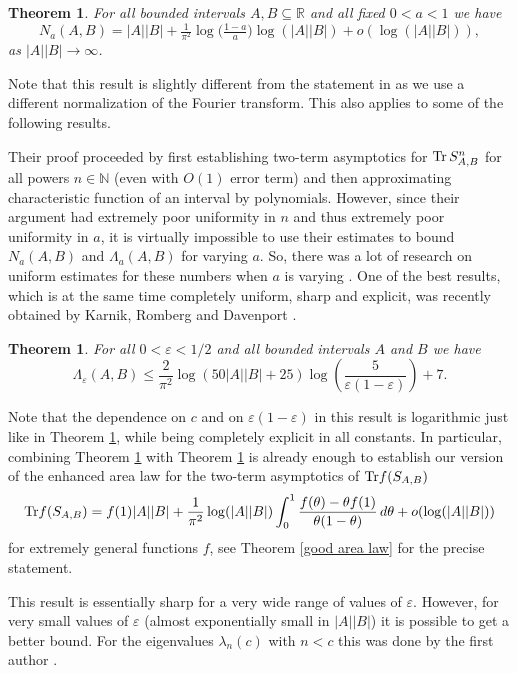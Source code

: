 \documentclass[12pt]{amsart}
\numberwithin{equation}{section}
\newcommand{\N}{\mathbb{N}}
\newcommand{\R}{\mathbb{R}}
\newcommand{\eps}{\varepsilon}
\newtheorem{theorem}[Thm]{Theorem}
\begin{document}
\begin{theorem}\label{Slepian}
For all bounded intervals $A, B \subseteq \R$ and all fixed $0<a<1$ we have
\[
N_a(A,B) = |A||B| + \tfrac{1}{\pi^2}\log\big(\tfrac{1-a}{a}\big)\log(|A||B|) + o(\log (|A||B|)),
\]
as $|A||B| \to \infty$.
\end{theorem}
Note that this result is slightly different from the statement in \cite{widom_landau} as we use a different normalization of the Fourier transform. This also applies to some of the following results.

Their proof proceeded by first establishing two-term asymptotics for ${\rm Tr}\, S^n_{A,B}$ for all powers $n\in\N$ (even with $O(1)$ error term) and then approximating characteristic function of an interval by polynomials. However, since their argument had extremely poor uniformity in $n$ and thus extremely poor uniformity in $a$, it is virtually impossible to use their estimates to bound $N_a(A,B)$ and $\Lambda_a(A,B)$ for varying $a$. So, there was a lot of research on uniform estimates for these numbers when $a$ is varying \cite{Israel2015,Bonami_Karoui_17,Kulikov_24}. One of the best results, which is at the same time completely uniform, sharp and explicit, was recently obtained by Karnik, Romberg and Davenport \cite{Karnik_Romberg_Davenport}.

\begin{theorem}\label{Karnik}
For all $0<\eps<1/2$ and all bounded intervals $A$ and $B$ we have
\[
\Lambda_\eps(A,B) \leq \frac{2}{\pi^2} \log(50 |A||B|+25) \log\left(\frac{5}{\eps(1-\eps)}\right) + 7.
\]
\end{theorem}

Note that the dependence on $c$ and on $\eps(1-\eps)$ in this result is logarithmic just like in Theorem \ref{Slepian}, while being completely explicit in all constants. In particular, combining Theorem \ref{Karnik} with Theorem \ref{Slepian} is already enough to establish our version of the enhanced area law for the two-term asymptotics of ${\rm{Tr}} f(S_{A,B})$
$${\rm{Tr}} f(S_{A,B}) =f(1)|A||B|+ \frac{1}{\pi^2} \log(|A||B|) \int_0^1 \frac{f(\theta) - \theta f(1)}{\theta(1-\theta)} \, d\theta + o(\log(|A||B|))$$
for extremely general functions $f$, see Theorem \ref{good area law} for the precise statement.

This result is essentially sharp for a very wide range of values of $\eps$. However, for very small values of $\eps$ (almost exponentially small in $|A||B|$) it is possible to get a better bound. For the eigenvalues $\lambda_n(c)$ with $n < c$ this was done by the first author \cites{kulikov_2026}. 
\end{document}
